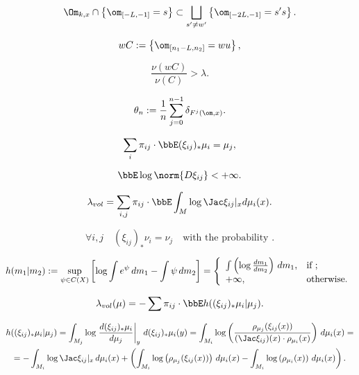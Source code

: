 \documentclass[a4paper,12pt]{article}
\begin{document}
\begin{equation}\label{e:next_cyl}
\Om_{k,x} \cap \left\{ \om_{[-L,-1]} = s \right\} \subset \bigsqcup_{s' \ne w'} \left\{ \om_{[-2L,-1]} = s's \right\}.
\end{equation}

$$
wC := \left\{ \om_{[n_1 - L, n_2]} = wu \right\},
$$

$$
  \frac{\nu(wC)}{\nu(C)} > \lambda.
  $$

$$
\theta_n:=\frac{1}{n} \sum_{j=0}^{n-1} \delta_{F^j(\om,x)}.
$$

\begin{equation}\label{e:stoch_img_2}
  \sum_i \pi_{ij}  \cdot \bbE (\xi_{ij})_* \mu_i = \mu_j,
\end{equation}

\begin{equation}\label{e:lognorm}
\bbE \log \norm{D\xi_{ij}} < +\infty.
\end{equation}

\begin{equation}\label{e:lyap-vol}
    \lambda_{vol} = \sum_{i,j} \pi_{ij} \cdot \bbE \int_M \log \Jac \xi_{ij}|_x d\mu_i(x).
\end{equation}

$$
    \forall i,j \quad (\xi_{ij})_* \nu_i = \nu_j \quad \text{with the probability~}.
  $$

\begin{equation}\label{e:rel-entropy}
h(m_1|m_2) := \sup_{\psi \in C(X)} \left[ \log \int e^\psi \,dm_1 - \int \psi \,dm_2 \right] =
\left\{
  \begin{array}{ll}
    \int \left( \log \frac{dm_1}{dm_2} \right) \,dm_1, & \hbox{if ;}   \\
    +\infty, & \hbox{otherwise.}
  \end{array}
\right.
\end{equation}

\begin{equation}\label{e:lyap-vol-entropy}
    \lambda_{vol}(\mu) = -\sum \pi_{ij} \cdot \bbE h ((\xi_{ij})_* \mu_i | \mu_j).
\end{equation}

\begin{multline}\label{e:lyap-rel}
h ((\xi_{ij})_* \mu_i | \mu_j) = \int_{M_j} \log \left. \frac{d (\xi_{ij})_* \mu_i}{d\mu_j}\right|_{y}  \, d (\xi_{ij})_* \mu_i(y)= \int_{M_i} \log \left(\frac {\rho_{\mu_j}(\xi_{ij}(x))}{(\Jac \xi_{ij})(x) \cdot \rho_{\mu_i}(x)}\right) \, d \mu_i(x)=
\\
= -  \int_{M_i} \log \Jac \xi_{ij}|_{x}  \, d \mu_i(x) + \left(
\int_{M_i} \log \left({\rho_{\mu_j}(\xi_{ij}(x))}\right) \, d \mu_i(x) -
\int_{M_i} \log \left({\rho_{\mu_i}(x)}\right) \, d \mu_i(x)\right).
\end{multline}
\end{document}
